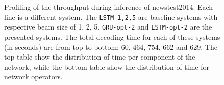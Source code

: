 \documentclass[11pt,a4paper]{article}
\begin{document}
\begin{figure}
\caption{Profiling of the throughput during inference of newstest2014. Each line is a different system. The {\tt LSTM-1,2,5} are baseline systems with respective beam size of 1, 2, 5. {\tt GRU-opt-2} and {\tt LSTM-opt-2} are the presented systems. The total decoding time for each of these systems (in seconds) are from top to bottom: 60, 464, 754, 662 and 629. The top table show the distribution of time per component of the network, while the bottom table show the distribution of time for network operators.}
\label{fig:decoding_cost}
\end{figure}
\end{document}
